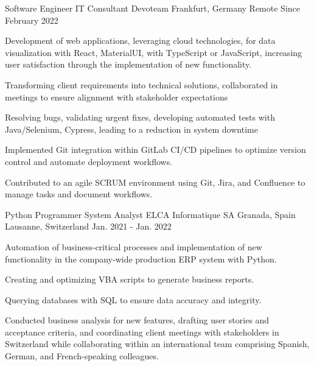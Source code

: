 

\begin{cventries}

  \cventry
    {Software Engineer {\enskip\cdotp\enskip} IT Consultant} %
    {Devoteam} %
    {Frankfurt, Germany {\enskip\cdotp\enskip} Remote} %
    {Since February 2022} %
    {
      \begin{cvitems} %
        \item Development of web applications, leveraging cloud technologies, for data visualization with React, MaterialUI, with TypeScript or JavaScript, increasing user satisfaction through the implementation of new functionality.
 \item Transforming client requirements into technical solutions, collaborated in meetings to ensure alignment with stakeholder expectations
     \item Resolving bugs, validating urgent fixes, developing automated tests with Java/Selenium, Cypress, leading to a reduction in system downtime
    \item Implemented Git integration within GitLab CI/CD pipelines to optimize version control and automate deployment workflows.
    \item Contributed to an agile SCRUM environment using Git, Jira, and Confluence to manage tasks and document workflows.
      \end{cvitems}
    }

  \cventry
    {Python Programmer {\enskip\cdotp\enskip} System Analyst}
    {ELCA Informatique SA}
    {Granada, Spain {\enskip\cdotp\enskip} Lausanne, Switzerland}
    {Jan. 2021 - Jan. 2022}
    {
      \begin{cvitems}
        \item Automation of business-critical processes and implementation of new functionality in the company-wide production ERP system with Python.
    \item Creating and optimizing VBA scripts to generate business reports.
    \item Querying databases with SQL to ensure data accuracy and integrity.
    \item Conducted business analysis for new features, drafting user stories and acceptance criteria, and coordinating client meetings with stakeholders in Switzerland while collaborating within an international team comprising Spanish, German, and French-speaking colleagues.
      \end{cvitems}
    }


\end{cventries}
